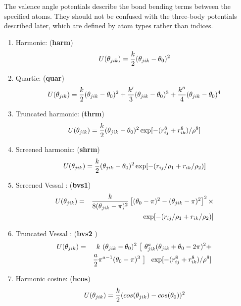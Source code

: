 The valence angle potentials
describe the bond bending terms between the specified atoms.  They
should not be confused with the
three-body potentials described later,
which are defined by atom types rather than indices.
\begin{enumerate}
\item Harmonic:  ({\bf harm})
\begin{equation}
 U(\theta_{jik}) = {k \over 2} (\theta_{jik} - \theta_0)^{2}
\end{equation}
\item Quartic:  ({\bf quar})
\begin{equation}
 U(\theta_{jik}) = {k \over 2}(\theta_{jik} - \theta_0)^{2} + {k' \over
3}(\theta_{jik} - \theta_0)^{3} + {k'' \over 4}(\theta_{jik} -
\theta_0)^{4}
\end{equation}
\item Truncated harmonic:  ({\bf thrm})
\begin{equation}
U(\theta_{jik}) = {k\over 2} (\theta_{jik} - \theta_0)^{2}
\exp[-(r_{ij}^{8} + r_{ik}^{8}) / \rho^{8}]
\end{equation}
\item Screened harmonic:  ({\bf shrm})
\begin{equation}
 U(\theta_{jik}) = {k\over 2} (\theta_{jik} - \theta_0)^{2}
\exp[-(r_{ij} / \rho_1 + r_{ik} / \rho_2)]
\end{equation}
\item Screened Vessal \cite{vessal-94a}:  ({\bf bvs1})
\begin{eqnarray}
U(\theta_{jik})&=&{k \over 8(\theta_{jik}-\pi)^{2}} \left[ (\theta_0
-\pi)^{2} -(\theta_{jik}-\pi)^{2}\right]^{2} \times \nonumber \\
              & &  \exp[-(r_{ij} / \rho_1 + r_{ik} / \rho_2)]
\end{eqnarray}
\item Truncated Vessal \cite{smith-95a}:  ({\bf bvs2 })
\begin{eqnarray}
U(\theta_{jik})&=& k~(\theta_{jik}-\theta_{0})^{2}~
\big[~\theta_{jik}^a (\theta_{jik}+\theta_{0}-2\pi)^{2} + \nonumber \\
& & {a \over 2} \pi^{a-1} (\theta_{0}-\pi)^{3}~\big]~~\exp[-(r_{ij}^{8} + r_{ik}^{8}) / \rho^{8}]
\end{eqnarray}
\item Harmonic cosine:  ({\bf hcos})
\begin{equation}
U(\theta_{jik}) = {k\over 2}(cos(\theta_{jik})
-cos(\theta_{0}))^{2}

\end{equation}
\end{enumerate}
